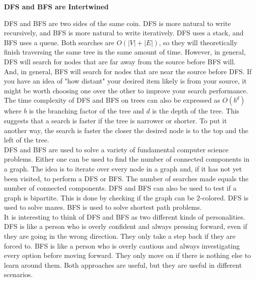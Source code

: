 \begin{tcolorbox}[enhanced, colback=textbook-blue, sharp corners]
    \vspace{2mm}
    \begin{center}
        \textbf{DFS and BFS are Intertwined}
    \end{center}
    
    DFS and BFS are two sides of the same coin. DFS is more natural to write recursively, and BFS is more natural to write iteratively. DFS uses a stack, and BFS uses a queue. Both searches are $O(|V|+|E|)$, so they will theoretically finish traversing the same tree in the same amount of time. However, in general, DFS will search for nodes that are far away from the source before BFS will. And, in general, BFS will search for nodes that are near the source before DFS. If you have an idea of "how distant" your desired item likely is from your source, it might be worth choosing one over the other to improve your search performance. \\
    
    The time complexity of DFS and BFS on trees can also be expressed as $O(b^d)$ where $b$ is the branching factor of the tree and $d$ is the depth of the tree. This suggests that a search is faster if the tree is narrower or shorter. To put it another way, the search is faster the closer the desired node is to the top and the left of the tree. \\
    
    DFS and BFS are used to solve a variety of fundamental computer science problems. Either one can be used to find the number of connected components in a graph. The idea is to iterate over every node in a graph and, if it has not yet been visited, to perform a DFS or BFS. The number of searches made equals the number of connected components. DFS and BFS can also be used to test if a graph is bipartite. This is done by checking if the graph can be $2$-colored. DFS is used to solve mazes. BFS is used to solve shortest path problems. \\
    
    It is interesting to think of DFS and BFS as two different kinds of personalities. DFS is like a person who is overly confident and always pressing forward, even if they are going in the wrong direction. They only take a step back if they are forced to. BFS is like a person who is overly cautious and always investigating every option before moving forward. They only move on if there is nothing else to learn around them. Both approaches are useful, but they are useful in different scenarios. \\

\end{tcolorbox}
\vspace{5mm}

